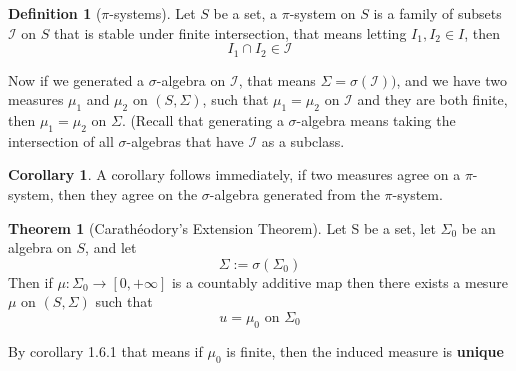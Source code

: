 \documentclass[12pt]{article}
\theoremstyle{definition}
\newtheorem{theorem}{Theorem}[section]
\newtheorem{definition}{Definition}[section]
\newtheorem{corollary}{Corollary}[section]
\begin{document}
\begin{definition}[$\pi$-systems] \label{def:pi-system}
	Let $S$ be a set, a $\pi$-system on $S$ is a family of subsets $\mathcal{I}$ on $S$ that is stable under finite intersection, that means letting $I_1, I_2 \in I$, then 
	$$
	I_1 \cap I_2  \in \mathcal{I}
	$$

\end{definition}
Now if we generated a $\sigma$-algebra on $\mathcal{I}$, that means $\Sigma = \sigma(\mathcal{I}))$, and we have two measures $\mu_1$ and $\mu_2$ on $(S,\Sigma)$, such that $\mu_1 = \mu_2$ on $\mathcal{I}$ and they are both finite, then $\mu_1 = \mu_2$ on $\Sigma$. (Recall that generating a $\sigma$-algebra means taking the intersection of all $\sigma$-algebras that have $\mathcal{I}$ as a subclass.
\begin{corollary}
	A corollary follows immediately, if two measures agree on a $\pi$-system, then they agree on the $\sigma$-algebra generated from the $\pi$-system.
\end{corollary}
\begin{theorem}[Carathéodory's Extension Theorem]
	Let S be a set, let $\Sigma_0$ be an algebra on $S$, and let 
	$$
		\Sigma := \sigma(\Sigma_0)
	$$
	Then if $\mu \colon \Sigma_0 \to [0,+\infty]$ is a countably additive map then there exists a mesure $\mu$ on $(S, \Sigma)$ such that
	$$
		u = \mu_0 \text{ on } \Sigma_0
	$$
\end{theorem}
By corollary 1.6.1 that means if $\mu_0$ is finite, then the induced measure is \textbf{unique}
\end{document}
